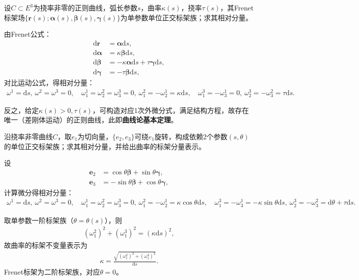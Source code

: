 \documentclass[../../main.tex]{subfiles}%
\begin{document}
\begin{example}
设$C\subset E^3$为挠率非零的正则曲线，弧长参数$s$，曲率$\kappa(s)$，挠率$\tau(s)$，其Frenet标架场$\{\boldsymbol{r}(s);\boldsymbol{\alpha}(s),\boldsymbol{\beta}(s),\boldsymbol{\gamma}(s)\}$为单参数单位正交标架族；求其相对分量。
\end{example}
\begin{solution}
由Frenet公式：
\begin{align*}
\mathrm{d}\boldsymbol{r}&=\boldsymbol{\alpha}\mathrm{d}s,\\
\mathrm{d}\boldsymbol{\alpha}&=\kappa\boldsymbol{\beta}\mathrm{d}s,\\
\mathrm{d}\boldsymbol{\beta}&=-\kappa\boldsymbol{\alpha}\mathrm{d}s+\tau\boldsymbol{\gamma}\mathrm{d}s,\\
\mathrm{d}\boldsymbol{\gamma}&=-\tau\boldsymbol{\beta}\mathrm{d}s,
\end{align*}
对比运动公式，得相对分量：
\begin{align*}
\omega^1=\mathrm{d}s,\ \omega^2=\omega^3=0,\quad \omega_1^1=\omega_2^2=\omega_3^3=0,\ \omega_1^2=-\omega_2^1=\kappa\mathrm{d}s,\quad \omega_1^3=-\omega_3^1=0,\ \omega_2^3=-\omega_3^2=\tau\mathrm{d}s.
\end{align*}

反之，给定$\kappa(s)>0,\tau(s)$，可构造对应1次外微分式，满足结构方程，故存在唯一（差刚体运动）的正则曲线，此即\textbf{曲线论基本定理}。

\end{solution}

\begin{example}
沿挠率非零曲线$C$，取$e_1$为切向量，$\{e_2,e_3\}$可绕$e_1$旋转，构成依赖2个参数$(s,\theta)$的单位正交标架族；求其相对分量，并给出曲率的标架分量表示。
\end{example}
\begin{solution}
设
\begin{align*}
\boldsymbol{e}_2&=\cos\theta\boldsymbol{\beta}+\sin\theta\boldsymbol{\gamma},\\
\boldsymbol{e}_3&=-\sin\theta\boldsymbol{\beta}+\cos\theta\boldsymbol{\gamma},
\end{align*}
计算微分得相对分量：
\begin{align*}
\omega^1=\mathrm{d}s,\ \omega^2=\omega^3=0,\quad \omega_1^1=\omega_2^2=\omega_3^3=0,\ \omega_1^2=-\omega_2^1=\kappa\cos\theta\mathrm{d}s,\quad \omega_1^3=-\omega_3^1=-\kappa\sin\theta\mathrm{d}s,\ \omega_2^3=-\omega_3^2=\mathrm{d}\theta+\tau\mathrm{d}s.
\end{align*}

取单参数一阶标架族（$\theta=\theta(s)$），则
\begin{align*}
(\omega_1^2)^2+(\omega_1^3)^2=(\kappa\mathrm{d}s)^2,
\end{align*}
故曲率的标架不变量表示为
\begin{align}
\kappa=\frac{\sqrt{(\omega_1^2)^2+(\omega_1^3)^2}}{\mathrm{d}s}.
\label{eq:curvature_frame}
\end{align}
Frenet标架为二阶标架族，对应$\theta=0$。

\end{solution}
\end{document}
